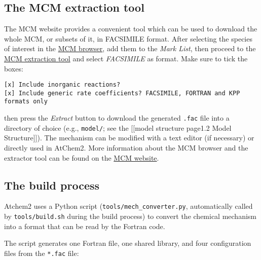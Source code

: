 \hypertarget{the-mcm-extraction-tool}{%
\subsection{The MCM extraction tool}\label{the-mcm-extraction-tool}}

The MCM website provides a convenient tool which can be used to download
the whole MCM, or subsets of it, in FACSIMILE format. After selecting
the species of interest in the
\href{http://mcm.leeds.ac.uk/MCMv3.3.1/roots.htt}{MCM browser}, add them
to the \emph{Mark List}, then proceed to the
\href{http://mcm.leeds.ac.uk/MCMv3.3.1/extract.htt}{MCM extraction tool}
and select \emph{FACSIMILE} as format. Make sure to tick the boxes:

\begin{verbatim}
[x] Include inorganic reactions?
[x] Include generic rate coefficients? FACSIMILE, FORTRAN and KPP formats only
\end{verbatim}

then press the \emph{Extract} button to download the generated
\texttt{.fac} file into a directory of choice (e.g., \texttt{model/};
see the {[}{[}model structure page\textbar{}1.2 Model Structure{]}{]}).
The mechanism can be modified with a text editor (if necessary) or
directly used in AtChem2. More information about the MCM browser and the
extractor tool can be found on the \href{http://mcm.leeds.ac.uk}{MCM
website}.

\hypertarget{the-build-process}{%
\subsection{The build process}\label{the-build-process}}

Atchem2 uses a Python script (\texttt{tools/mech\_converter.py},
automatically called by \texttt{tools/build.sh} during the build
process) to convert the chemical mechanism into a format that can be
read by the Fortran code.

The script generates one Fortran file, one shared library, and four
configuration files from the \texttt{*.fac} file:

